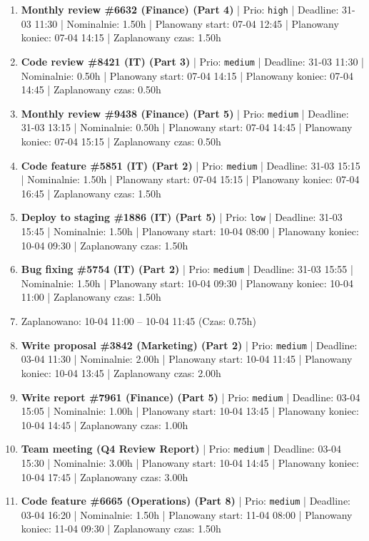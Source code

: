 {\begin{enumerate}
  \item [\textbf{14615}] \textbf{Monthly review \#6632 (Finance) (Part 4)} | Prio: \texttt{high} | Deadline: 31-03 11:30 | Nominalnie: 1.50h | Planowany start: 07-04 12:45 | Planowany koniec: 07-04 14:15 | Zaplanowany czas: 1.50h
  \item [\textbf{14665}] \textbf{Code review \#8421 (IT) (Part 3)} | Prio: \texttt{medium} | Deadline: 31-03 11:30 | Nominalnie: 0.50h | Planowany start: 07-04 14:15 | Planowany koniec: 07-04 14:45 | Zaplanowany czas: 0.50h
  \item [\textbf{14656}] \textbf{Monthly review \#9438 (Finance) (Part 5)} | Prio: \texttt{medium} | Deadline: 31-03 13:15 | Nominalnie: 0.50h | Planowany start: 07-04 14:45 | Planowany koniec: 07-04 15:15 | Zaplanowany czas: 0.50h
  \item [\textbf{14643}] \textbf{Code feature \#5851 (IT) (Part 2)} | Prio: \texttt{medium} | Deadline: 31-03 15:15 | Nominalnie: 1.50h | Planowany start: 07-04 15:15 | Planowany koniec: 07-04 16:45 | Zaplanowany czas: 1.50h
  \item [\textbf{14697}] \textbf{Deploy to staging \#1886 (IT) (Part 5)} | Prio: \texttt{low} | Deadline: 31-03 15:45 | Nominalnie: 1.50h | Planowany start: 10-04 08:00 | Planowany koniec: 10-04 09:30 | Zaplanowany czas: 1.50h
  \item [\textbf{14631}] \textbf{Bug fixing \#5754 (IT) (Part 2)} | Prio: \texttt{medium} | Deadline: 31-03 15:55 | Nominalnie: 1.50h | Planowany start: 10-04 09:30 | Planowany koniec: 10-04 11:00 | Zaplanowany czas: 1.50h
  \item [\textbf{PRZERWA}] Zaplanowano: 10-04 11:00 -- 10-04 11:45 (Czas: 0.75h)
  \item [\textbf{14673}] \textbf{Write proposal \#3842 (Marketing) (Part 2)} | Prio: \texttt{medium} | Deadline: 03-04 11:30 | Nominalnie: 2.00h | Planowany start: 10-04 11:45 | Planowany koniec: 10-04 13:45 | Zaplanowany czas: 2.00h
  \item [\textbf{14657}] \textbf{Write report \#7961 (Finance) (Part 5)} | Prio: \texttt{medium} | Deadline: 03-04 15:05 | Nominalnie: 1.00h | Planowany start: 10-04 13:45 | Planowany koniec: 10-04 14:45 | Zaplanowany czas: 1.00h
  \item [\textbf{14635}] \textbf{Team meeting (Q4 Review Report)} | Prio: \texttt{medium} | Deadline: 03-04 15:30 | Nominalnie: 3.00h | Planowany start: 10-04 14:45 | Planowany koniec: 10-04 17:45 | Zaplanowany czas: 3.00h
  \item [\textbf{14667}] \textbf{Code feature \#6665 (Operations) (Part 8)} | Prio: \texttt{medium} | Deadline: 03-04 16:20 | Nominalnie: 1.50h | Planowany start: 11-04 08:00 | Planowany koniec: 11-04 09:30 | Zaplanowany czas: 1.50h

\end{enumerate}}
